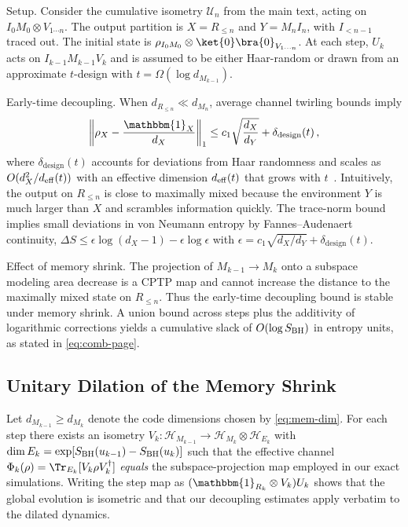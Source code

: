 \documentclass[aps,prd,preprint,onecolumn,superscriptaddress,nofootinbib,longbibliography,floatfix,11pt,showpacs,showkeys]{revtex4-2}
\theoremstyle{plain}
\theoremstyle{definition}
\theoremstyle{remark}
\begin{document}
Setup. Consider the cumulative isometry $\mathcal{U}_n$ from the main text, acting on $I_0 M_0 \otimes V_{1\cdots n}$. The output partition is $X=R_{\le n}$ and $Y=M_n I_n$, with $I_{<n-1}$ traced out. The initial state is $\rho_{I_0M_0}\otimes \ket{0}\bra{0}_{V_{1\cdots n}}$. At each step, $U_k$ acts on $I_{k-1}M_{k-1}V_k$ and is assumed to be either Haar-random or drawn from an approximate $t$-design with $t=\Omega(\log d_{M_{k-1}})$.

Early-time decoupling. When $d_{R_{\le n}}\ll d_{M_n}$, average channel twirling bounds imply 
\begin{equation}
\left\|\rho_{X} - \frac{\mathbbm{1}_X}{d_X}\right\|_1 \le c_1 \sqrt{\frac{d_X}{d_Y}} + \delta_{\text{design}}(t)\,,
\end{equation}
where $\delta_{\text{design}}(t)$ accounts for deviations from Haar randomness and scales as $O(d_X^2/d_{\rm eff}(t))$ with an effective dimension $d_{\rm eff}(t)$ that grows with $t$~\cite{Brandao:2016}. Intuitively, the output on $R_{\le n}$ is close to maximally mixed because the environment $Y$ is much larger than $X$ and scrambles information quickly. The trace-norm bound implies small deviations in von Neumann entropy by Fannes--Audenaert continuity, $\Delta S \le \epsilon \log (d_X-1)-\epsilon \log \epsilon$ with $\epsilon=c_1\sqrt{d_X/d_Y}+\delta_{\text{design}}(t)$.

Effect of memory shrink. The projection of $M_{k-1}\to M_k$ onto a subspace modeling area decrease is a CPTP map and cannot increase the distance to the maximally mixed state on $R_{\le n}$. Thus the early-time decoupling bound is stable under memory shrink. A union bound across steps plus the additivity of logarithmic corrections yields a cumulative slack of $O(\log S_{\rm BH})$ in entropy units, as stated in \eqref{eq:comb-page}.

\subsection{Unitary Dilation of the Memory Shrink}
Let $d_{M_{k-1}}\ge d_{M_k}$ denote the code dimensions chosen by \eqref{eq:mem-dim}. For each step there exists an isometry $V_k:\mathcal{H}_{M_{k-1}}\to\mathcal{H}_{M_k}\otimes\mathcal{H}_{E_k}$ with $\dim E_k=\exp\!\left[S_{\rm BH}(u_{k-1})-S_{\rm BH}(u_k)\right]$ such that the effective channel $\Phi_k(\rho)=\Tr_{E_k}[V_k \rho V_k^\dagger]$ \emph{equals} the subspace-projection map employed in our exact simulations. Writing the step map as $(\mathbbm{1}_{R_k}\otimes V_k)U_k$ shows that the global evolution is isometric and that our decoupling estimates apply verbatim to the dilated dynamics.
\end{document}
